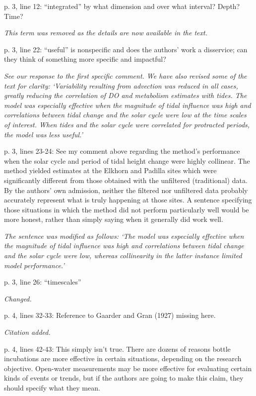 \documentclass[letterpaper,12pt]{article}\usepackage[]{graphicx}\usepackage[]{color}
\begin{document}
p. 3, line 12: “integrated” by what dimension and over what interval? Depth? Time?

{\it This term was removed as the details are now available in the text.}

p. 3, line 22: “useful” is nonspecific and does the authors’ work a disservice; can they think of
something more specific and impactful?

{\it See our response to the first specific comment.  We have also revised some of the text for clarity: `Variability resulting from advection was reduced in all cases, greatly reducing the correlation of DO and metabolism estimates with tides. The model was especially effective when the magnitude of tidal influence was high and correlations between tidal change and the solar cycle were low at the time scales of interest.  When tides and the solar cycle were correlated for protracted periods, the model was less useful.'}

p. 3, lines 23-24: See my comment above regarding the method’s performance when the solar cycle and period of tidal height change were highly collinear. The method yielded estimates at the Elkhorn and Padilla sites which were significantly different from those obtained with the unfiltered (traditional) data. By the authors’ own admission, neither the filtered nor unfiltered data probably accurately represent what is truly happening at those sites. A sentence specifying those situations in which the method did not perform particularly well would be more honest, rather than simply saying when it generally did work well.

{\it The sentence was modified as follows: `The model was especially effective when the magnitude of tidal influence was high and correlations between tidal change and the solar cycle were low, whereas collinearity in the latter instance limited model performance.'
}

p. 3, line 26: “timescales”

{\it Changed.}

p. 4, lines 32-33: Reference to Gaarder and Gran (1927) missing here.

{\it Citation added.}

p. 4, lines 42-43: This simply isn’t true. There are dozens of reasons bottle incubations are more effective in certain situations, depending on the research objective. Open-water measurements may be more effective for evaluating certain kinds of events or trends, but if the authors are going to make this claim, they should specify what they mean.
\end{document}
